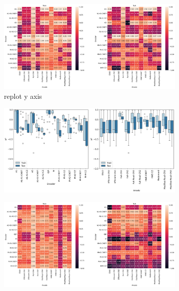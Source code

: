 \documentclass[journal=jacsat,manuscript=article]{achemso}
\begin{document}
\begin{figure}[H]
	\centering
	\begin{subfigure}[b]{0.49\textwidth}
		\centering
		\includegraphics[width=\textwidth]{../images/Function_Fitting/fivequbit/linear_heatplots.png}
		\caption{replot y axis}
		\label{fig:linear_heatplots}
	\end{subfigure}
	\hfill
	\begin{subfigure}[b]{0.49\textwidth}
		\centering
		\includegraphics[width=\textwidth]{../images/Function_Fitting/fivequbit/linear_boxplots.png}
		\caption{}
		\label{fig:linear_boxplots}
	\end{subfigure}
	\hfill	
	\begin{subfigure}[b]{0.49\textwidth}
		\centering
		\includegraphics[width=\textwidth]{../images/Function_Fitting/fivequbit/quadratic_heatplots.png}

\end{subfigure}
\end{figure}
\end{document}
